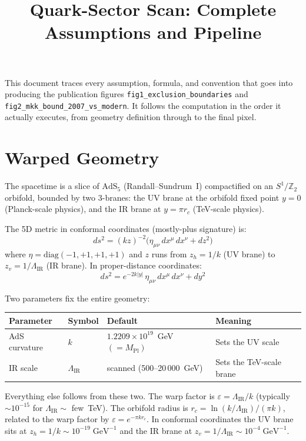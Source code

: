 \documentclass[11pt]{article}
\title{Quark-Sector Scan: Complete Assumptions and Pipeline}
\author{}
\date{}
\newcommand{\LamIR}{\Lambda_{\mathrm{IR}}}
\newcommand{\Mpl}{M_{\mathrm{Pl}}}
\begin{document}
\maketitle

This document traces every assumption, formula, and convention that goes into
producing the publication figures \texttt{fig1\_exclusion\_boundaries} and
\texttt{fig2\_mkk\_bound\_2007\_vs\_modern}. It follows the computation in the
order it actually executes, from geometry definition through to the final pixel.

\section{Warped Geometry}
\label{sec:step0}

The spacetime is a slice of $\mathrm{AdS}_5$ (Randall--Sundrum~I) compactified
on an $S^1/\mathbb{Z}_2$ orbifold, bounded by two 3-branes: the UV brane at
the orbifold fixed point $y = 0$ (Planck-scale physics), and the IR brane at
$y = \pi r_c$ (TeV-scale physics).

The 5D metric in conformal coordinates (mostly-plus signature) is:
\begin{equation}
  ds^2 = (kz)^{-2}\bigl(\eta_{\mu\nu}\,dx^\mu\,dx^\nu + dz^2\bigr)
\end{equation}
where $\eta = \mathrm{diag}(-1,+1,+1,+1)$ and $z$ runs from $z_h = 1/k$
(UV brane) to $z_v = 1/\LamIR$ (IR brane).  In proper-distance coordinates:
\begin{equation}
  ds^2 = e^{-2k|y|}\,\eta_{\mu\nu}\,dx^\mu\,dx^\nu + dy^2
\end{equation}

Two parameters fix the entire geometry:

\begin{table}[h]
\centering
\begin{tabular}{@{}llll@{}}
\toprule
Parameter & Symbol & Default & Meaning \\
\midrule
AdS curvature & $k$ & $1.2209\times10^{19}$~GeV $(= \Mpl)$ & Sets the UV scale \\
IR scale & $\LamIR$ & scanned (500--20\,000~GeV) & Sets the TeV-scale brane \\
\bottomrule
\end{tabular}
\end{table}

Everything else follows from these two. The warp factor is
$\varepsilon = \LamIR / k$ (typically $\sim 10^{-15}$ for
$\LamIR \sim$ few~TeV). The orbifold radius is
$r_c = \ln(k/\LamIR)/(\pi k)$, related to the warp factor by
$\varepsilon = e^{-\pi k r_c}$. In conformal coordinates the UV brane sits at
$z_h = 1/k \sim 10^{-19}\;\mathrm{GeV}^{-1}$ and the IR brane at
$z_v = 1/\LamIR \sim 10^{-4}\;\mathrm{GeV}^{-1}$.
\end{document}
